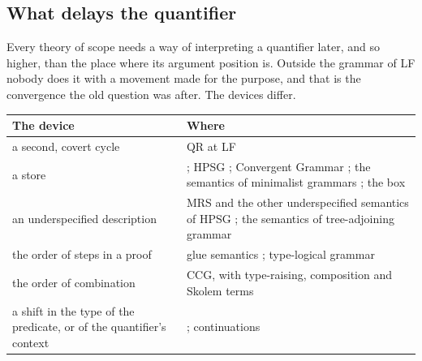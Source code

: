 \documentclass[
  layout=tufte,           %
  twoside=false, open=any,
  font=pagella,
  chapterprefix=false,
  numbers=noendperiod,    %
  headings=optiontohead,  %
  parskip=half-,          %
  colorlinks=true,
  examples=gb4e,
  minsyn=true,            %
  bib=natbib, bibstyle=glossa, bibfile=keio,
  greek=false,
]{gtbook}
\makeatletter
\def\keio@pfx{}
\let\keio@label\label
\renewcommand\label[1]{\keio@label{\keio@pfx#1}}%
\makeatother
\begin{document}
\subsection{What delays the quantifier}\label{sec:nb-delay}

Every theory of scope needs a way of interpreting a quantifier later, and so higher, than the place where its argument position is. Outside the grammar of LF nobody does it with a movement made for the purpose, and that is the convergence the old question was after. The devices differ.

\begin{center}\small
\begin{tabularx}{\linewidth}{@{}P{4.0cm}L@{}}
\toprule
The device & Where\\
\midrule
a second, covert cycle & QR at LF \citep{May1977,May1985,HeimKratzer1998}\\
a store & \citet{Cooper1983}; HPSG \citep{PollardSag1994,PollardYoo1998}; Convergent Grammar \citep{Pollard2011}; the semantics of minimalist grammars \citep{Kobele2006,Kobele2018}; the box\\
an underspecified description & MRS \citep{CopestakeEtAl2005} and the other underspecified semantics of HPSG \citep{RichterSailer1999,KoenigRichter2021}; the semantics of tree-adjoining grammar \citep{KallmeyerRomero2008}\\
the order of steps in a proof & glue semantics \citep{Dalrymple2001,Asudeh2023}; type-logical grammar \citep{Moortgat1997,KubotaLevine2020}\\
the order of combination & CCG, with type-raising, composition and Skolem terms \citep{Steedman2012}\\
a shift in the type of the predicate, or of the quantifier's context & \citet{Hendriks1993}; continuations \citep{Barker2002,BarkerShan2014}\\
\bottomrule
\end{tabularx}
\end{center}
\end{document}
